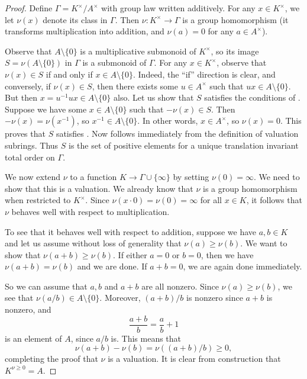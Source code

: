 \begin{proof}
Define $\Gamma = K^\times/A^\times$ with group law written additively. For any $x \in K^\times$, we let $\nu(x)$ denote its class in $\Gamma$. Then $\nu : K^\times \to \Gamma$ is a group homomorphism (it transforms multiplication into addition, and $\nu(a) = 0$ for any $a \in A^\times$). 

Observe that $A \setminus \{0\}$ is a multiplicative submonoid of $K^\times$, so its image $S = \nu(A \setminus \{0\})$ in $\Gamma$ is a submonoid of $\Gamma$. For any $x \in K^\times$, observe that $\nu(x) \in S$ if and only if $x \in A \setminus \{0\}$. Indeed, the ``if'' direction is clear, and conversely, if $\nu(x) \in S$, then there exists some $u \in A^\times$ such that $ux \in A \setminus \{0\}$. But then $x = u^{-1}ux \in A \setminus \{0\}$ also. Let us show that $S$ satisfies the conditions of . Suppose we have some $x \in A \setminus \{0\}$ such that $-\nu(x) \in S$. Then $-\nu(x) = \nu(x^{-1})$, so $x^{-1} \in A \setminus \{0\}$. In other words, $x \in A^\times$, so $\nu(x) = 0$. This proves that $S$ satisfies . Now  follows immediately from the definition of valuation subrings.  Thus $S$ is the set of positive elements for a unique translation invariant total order on $\Gamma$. 

We now extend $\nu$ to a function $K \to \Gamma \cup \{\infty\}$ by setting $\nu(0) = \infty$. We need to show that this is a valuation. We already know that $\nu$ is a group homomorphism when restricted to $K^\times$. Since $\nu(x \cdot 0) = \nu(0) = \infty$ for all $x \in K$, it follows that $\nu$ behaves well with respect to multiplication. 

To see that it behaves well with respect to addition, suppose we have $a, b \in K$ and let us assume without loss of generality that $\nu(a) \geq \nu(b)$. We want to show that $\nu(a+b) \geq \nu(b)$. If either $a = 0$ or $b = 0$, then we have $\nu(a+b) = \nu(b)$ and we are done. If $a + b = 0$, we are again done immediately. 

So we can assume that $a, b$ and $a+b$ are all nonzero. Since $\nu(a) \geq \nu(b)$, we see that $\nu(a/b) \in A \setminus \{0\}$. Moreover, $(a+b)/b$ is nonzero since $a+b$ is nonzero, and
\[ \frac{a + b}{b} = \frac{a}{b} + 1 \]
is an element of $A$, since $a/b$ is. This means that 
\[ \nu(a+b) - \nu(b) = \nu((a+b)/b) \geq 0, \]
completing the proof that $\nu$ is a valuation. It is clear from construction that $K^{\nu \geq 0} = A$. 
\end{proof}

